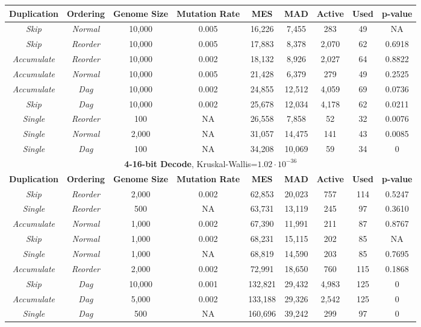 \documentclass[journal]{IEEEtran}
\begin{document}
\begin{table}
\begin{tabular}{|c|c|c|c|c|c|c|c|c|}
\textbf{Duplication} & \textbf{Ordering} & \textbf{Genome Size} & \textbf{Mutation Rate} & \textbf{MES} & \textbf{MAD} & \textbf{Active} & \textbf{Used} & \textbf{p-value} \\ \hline
\rowcolor{Gray}
\emph{Skip} & \emph{Normal}        & 10,000 & 0.005 & 16,226 & 7,455  &   283 & 49 & NA \\ \hline
\emph{Skip} & \emph{Reorder}       & 10,000 & 0.005 & 17,883 & 8,378  & 2,070 & 62 & 0.6918 \\ \hline
\emph{Accumulate} & \emph{Reorder} & 10,000 & 0.002 & 18,132 & 8,926  & 2,027 & 64 & 0.8822 \\ \hline
\emph{Accumulate} & \emph{Normal}  & 10,000 & 0.005 & 21,428 & 6,379  &   279 & 49 & 0.2525 \\ \hline
\emph{Accumulate} & \emph{Dag}     & 10,000 & 0.002 & 24,855 & 12,512 & 4,059 & 69 & 0.0736 \\ \hline
\emph{Skip} & \emph{Dag}           & 10,000 & 0.002 & 25,678 & 12,034 & 4,178 & 62 & 0.0211 \\ \hline
\emph{Single} & \emph{Reorder}     & 100    & NA    & 26,558 & 7,858  &    52 & 32 & 0.0076 \\ \hline
\emph{Single} & \emph{Normal}      & 2,000  & NA    & 31,057 & 14,475 &   141 & 43 & 0.0085 \\ \hline
\emph{Single} & \emph{Dag}         & 100    & NA    & 34,208 & 10,069 &    59 & 34 & 0 \\ \hline\hline

	  \multicolumn{9}{|c|}{\textbf{4-16-bit Decode}, Kruskal-Wallis=$1.02\cdot 10^{-36}$} \\ \hline


\textbf{Duplication} & \textbf{Ordering} & \textbf{Genome Size} & \textbf{Mutation Rate} & \textbf{MES} & \textbf{MAD} & \textbf{Active} & \textbf{Used} & \textbf{p-value} \\ \hline
\emph{Skip} & \emph{Reorder}       &  2,000 & 0.002 &  62,853 & 20,023 &   757 & 114 & 0.5247 \\ \hline
\emph{Single} & \emph{Reorder}     &    500 &    NA &  63,731 & 13,119 &   245 &  97 & 0.3610 \\ \hline
\emph{Accumulate} & \emph{Normal}  &  1,000 & 0.002 &  67,390 & 11,991 &   211 &  87 & 0.8767 \\ \hline
\rowcolor{Gray}
\emph{Skip} & \emph{Normal}        &  1,000 & 0.002 &  68,231 & 15,115 &   202 &  85 & NA \\ \hline
\emph{Single} & \emph{Normal}      &  1,000 &    NA &  68,819 & 14,590 &   203 &  85 & 0.7695 \\ \hline
\emph{Accumulate} & \emph{Reorder} &  2,000 & 0.002 &  72,991 & 18,650 &   760 & 115 & 0.1868 \\ \hline
\emph{Skip} & \emph{Dag}           & 10,000 & 0.001 & 132,821 & 29,432 & 4,983 & 125 & 0 \\ \hline
\emph{Accumulate} & \emph{Dag}     &  5,000 & 0.002 & 133,188 & 29,326 & 2,542 & 125 & 0 \\ \hline
\emph{Single} & \emph{Dag}         &    500 &    NA & 160,696 & 39,242 &   299 &  97 & 0 \\ \hline\hline


\end{tabular}
\end{table}
\end{document}
